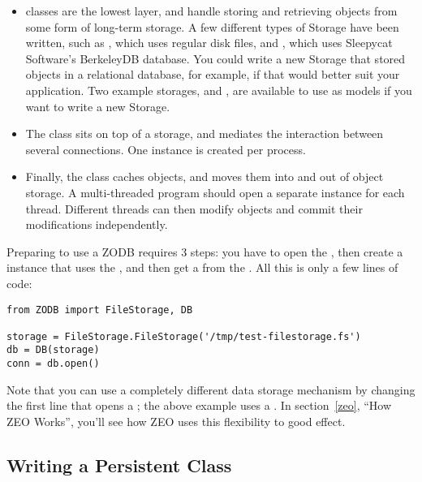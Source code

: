 \begin{itemize}
 \item {} classes are the lowest layer, and handle
 storing and retrieving objects from some form of long-term storage.
 A few different types of Storage have been written, such as
 , which uses regular disk files, and
 , which uses Sleepycat Software's BerkeleyDB
 database.  You could write a new Storage that stored objects in a
 relational database, for example, if that would
 better suit your application.  Two example storages,
  and , are available to use
 as models if you want to write a new Storage.

 \item The  class sits on top of a storage, and mediates the
 interaction between several connections.  One  instance is
 created per process.

 \item Finally, the  class caches objects, and moves
 them into and out of object storage.  A multi-threaded program should
 open a separate  instance for each thread.
 Different threads can then modify objects and commit their
 modifications independently.

\end{itemize}

Preparing to use a ZODB requires 3 steps: you have to open the
, then create a  instance that uses the
, and then get a  from the .  All this is only a few lines of code:

\begin{verbatim}
from ZODB import FileStorage, DB

storage = FileStorage.FileStorage('/tmp/test-filestorage.fs')
db = DB(storage)
conn = db.open()
\end{verbatim}

Note that you can use a completely different data storage mechanism by
changing the first line that opens a ; the above example uses a
.  In section~\ref{zeo}, ``How ZEO Works'',
you'll see how ZEO uses this flexibility to good effect.

\subsection{Writing a Persistent Class}

